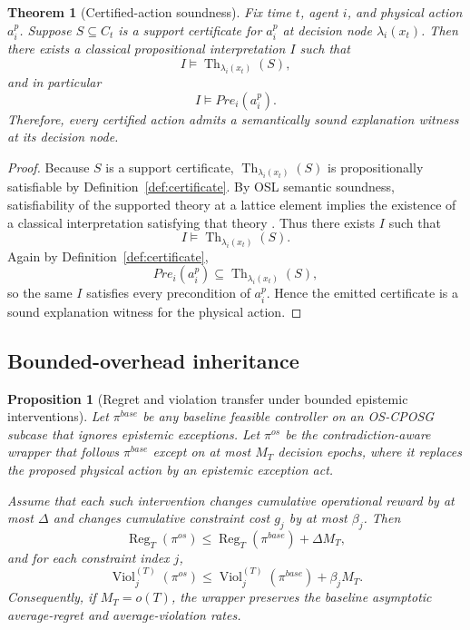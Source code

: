 \documentclass[11pt]{article}
\newcommand{\OSCPOSG}{\mbox{\normalfont\textsc{OS-CPOSG}}}
\newcommand{\Th}{\operatorname{Th}}
\newcommand{\Reg}{\operatorname{Reg}}
\newcommand{\Viol}{\operatorname{Viol}}
\newcommand{\1}{\mathbf{1}}
\theoremstyle{definition}
\theoremstyle{plain}
\newtheorem{proposition}[definition]{Proposition}
\newtheorem{theorem}[definition]{Theorem}
\theoremstyle{remark}
\begin{document}
\begin{theorem}[Certified-action soundness]
\label{supp:thm:certificate-soundness}
Fix time $t$, agent $i$, and physical action $a_i^p$. Suppose $S\subseteq C_t$ is a support certificate for $a_i^p$ at decision node $\lambda_i(x_t)$. Then there exists a classical propositional interpretation $I$ such that
\[
I\models \Th_{\lambda_i(x_t)}(S),
\]
and in particular
\[
I\models Pre_i(a_i^p).
\]
Therefore, every certified action admits a semantically sound explanation witness at its decision node.
\end{theorem}

\begin{proof}
Because $S$ is a support certificate, $\Th_{\lambda_i(x_t)}(S)$ is propositionally satisfiable by Definition~\ref{def:certificate}. By OSL semantic soundness, satisfiability of the supported theory at a lattice element implies the existence of a classical interpretation satisfying that theory \citep{Alqithami2026OSL}. Thus there exists $I$ such that
\[
I\models \Th_{\lambda_i(x_t)}(S).
\]
Again by Definition~\ref{def:certificate},
\[
Pre_i(a_i^p)\subseteq \Th_{\lambda_i(x_t)}(S),
\]
so the same $I$ satisfies every precondition of $a_i^p$. Hence the emitted certificate is a sound explanation witness for the physical action.
\end{proof}

\subsection{Bounded-overhead inheritance}

\begin{proposition}[Regret and violation transfer under bounded epistemic interventions]
\label{supp:prop:inheritance}
Let $\pi^{base}$ be any baseline feasible controller on an \OSCPOSG{} subcase that ignores epistemic exceptions. Let $\pi^{os}$ be the contradiction-aware wrapper that follows $\pi^{base}$ except on at most $M_T$ decision epochs, where it replaces the proposed physical action by an epistemic exception act.

Assume that each such intervention changes cumulative operational reward by at most $\Delta$ and changes cumulative constraint cost $g_j$ by at most $\beta_j$. Then
\[
\Reg_T(\pi^{os})
\le
\Reg_T(\pi^{base})+\Delta M_T,
\]
and for each constraint index $j$,
\[
\Viol_j^{(T)}(\pi^{os})
\le
\Viol_j^{(T)}(\pi^{base})+\beta_j M_T.
\]
Consequently, if $M_T=o(T)$, the wrapper preserves the baseline asymptotic average-regret and average-violation rates.
\end{proposition}
\end{document}
